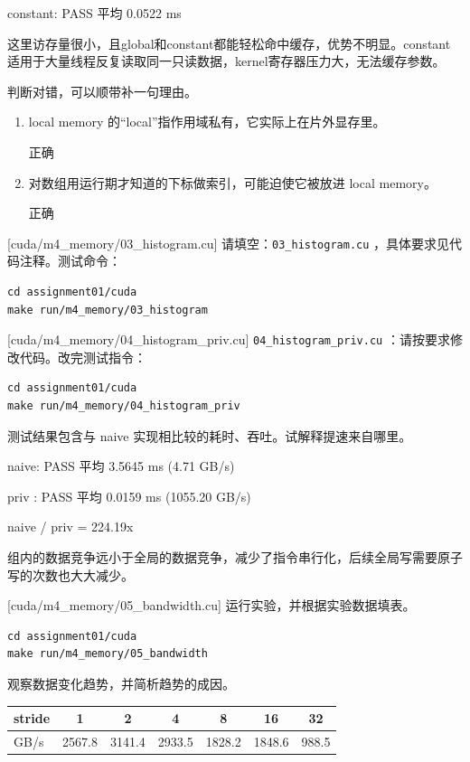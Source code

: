\documentclass[11pt,a4paper,fontset=none]{ctexart}
\begin{document}
constant: PASS  平均 0.0522 ms

这里访存量很小，且global和constant都能轻松命中缓存，优势不明显。constant适用于大量线程反复读取同一只读数据，kernel寄存器压力大，无法缓存参数。

判断对错，可以顺带补一句理由。
\begin{enumerate}[label=(\alph*)]
  \item local memory 的“local”指作用域私有，它实际上在片外显存里。

  正确

  \item 对数组用运行期才知道的下标做索引，可能迫使它被放进 local memory。

  正确
\end{enumerate}

[cuda/m4\_memory/03\_histogram.cu]
请填空：\texttt{03\_histogram.cu} ，具体要求见代码注释。测试命令：

\begin{lstlisting}
cd assignment01/cuda
make run/m4_memory/03_histogram
\end{lstlisting}

[cuda/m4\_memory/04\_histogram\_priv.cu]
\texttt{04\_histogram\_priv.cu} ：请按要求修改代码。改完测试指令：

\begin{lstlisting}
cd assignment01/cuda
make run/m4_memory/04_histogram_priv
\end{lstlisting}

测试结果包含与 naive 实现相比较的耗时、吞吐。试解释提速来自哪里。

naive: PASS  平均 3.5645 ms  (4.71 GB/s)

priv : PASS  平均 0.0159 ms  (1055.20 GB/s)

naive / priv = 224.19x

组内的数据竞争远小于全局的数据竞争，减少了指令串行化，后续全局写需要原子写的次数也大大减少。

[cuda/m4\_memory/05\_bandwidth.cu]
运行实验，并根据实验数据填表。

\begin{lstlisting}
cd assignment01/cuda
make run/m4_memory/05_bandwidth
\end{lstlisting}

观察数据变化趋势，并简析趋势的成因。

\begin{center}\small
\begin{tabular}{@{}lcccccc@{}}
\toprule
stride & 1 & 2 & 4 & 8 & 16 & 32 \\
\midrule
GB/s & 2567.8 & 3141.4 & 2933.5 & 1828.2 & 1848.6 & 988.5 \\
\bottomrule
\end{tabular}
\end{center}
\end{document}

